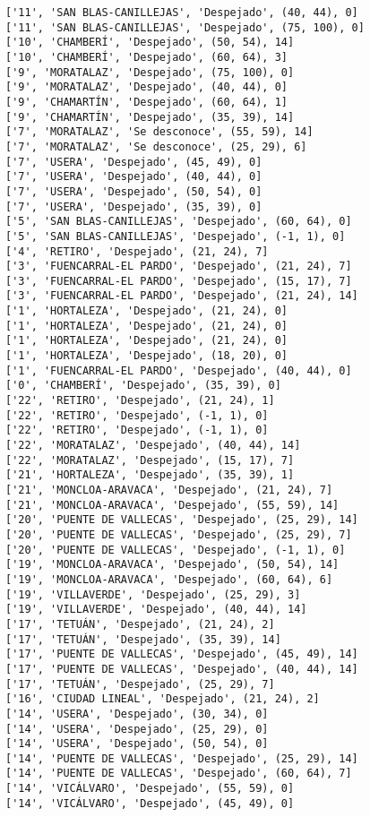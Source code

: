 \documentclass[11pt]{article}
\begin{document}
\begin{Verbatim}[commandchars=\\\{\}]
['11', 'SAN BLAS-CANILLEJAS', 'Despejado', (40, 44), 0]
['11', 'SAN BLAS-CANILLEJAS', 'Despejado', (75, 100), 0]
['10', 'CHAMBERÍ', 'Despejado', (50, 54), 14]
['10', 'CHAMBERÍ', 'Despejado', (60, 64), 3]
['9', 'MORATALAZ', 'Despejado', (75, 100), 0]
['9', 'MORATALAZ', 'Despejado', (40, 44), 0]
['9', 'CHAMARTÍN', 'Despejado', (60, 64), 1]
['9', 'CHAMARTÍN', 'Despejado', (35, 39), 14]
['7', 'MORATALAZ', 'Se desconoce', (55, 59), 14]
['7', 'MORATALAZ', 'Se desconoce', (25, 29), 6]
['7', 'USERA', 'Despejado', (45, 49), 0]
['7', 'USERA', 'Despejado', (40, 44), 0]
['7', 'USERA', 'Despejado', (50, 54), 0]
['7', 'USERA', 'Despejado', (35, 39), 0]
['5', 'SAN BLAS-CANILLEJAS', 'Despejado', (60, 64), 0]
['5', 'SAN BLAS-CANILLEJAS', 'Despejado', (-1, 1), 0]
['4', 'RETIRO', 'Despejado', (21, 24), 7]
['3', 'FUENCARRAL-EL PARDO', 'Despejado', (21, 24), 7]
['3', 'FUENCARRAL-EL PARDO', 'Despejado', (15, 17), 7]
['3', 'FUENCARRAL-EL PARDO', 'Despejado', (21, 24), 14]
['1', 'HORTALEZA', 'Despejado', (21, 24), 0]
['1', 'HORTALEZA', 'Despejado', (21, 24), 0]
['1', 'HORTALEZA', 'Despejado', (21, 24), 0]
['1', 'HORTALEZA', 'Despejado', (18, 20), 0]
['1', 'FUENCARRAL-EL PARDO', 'Despejado', (40, 44), 0]
['0', 'CHAMBERÍ', 'Despejado', (35, 39), 0]
['22', 'RETIRO', 'Despejado', (21, 24), 1]
['22', 'RETIRO', 'Despejado', (-1, 1), 0]
['22', 'RETIRO', 'Despejado', (-1, 1), 0]
['22', 'MORATALAZ', 'Despejado', (40, 44), 14]
['22', 'MORATALAZ', 'Despejado', (15, 17), 7]
['21', 'HORTALEZA', 'Despejado', (35, 39), 1]
['21', 'MONCLOA-ARAVACA', 'Despejado', (21, 24), 7]
['21', 'MONCLOA-ARAVACA', 'Despejado', (55, 59), 14]
['20', 'PUENTE DE VALLECAS', 'Despejado', (25, 29), 14]
['20', 'PUENTE DE VALLECAS', 'Despejado', (25, 29), 7]
['20', 'PUENTE DE VALLECAS', 'Despejado', (-1, 1), 0]
['19', 'MONCLOA-ARAVACA', 'Despejado', (50, 54), 14]
['19', 'MONCLOA-ARAVACA', 'Despejado', (60, 64), 6]
['19', 'VILLAVERDE', 'Despejado', (25, 29), 3]
['19', 'VILLAVERDE', 'Despejado', (40, 44), 14]
['17', 'TETUÁN', 'Despejado', (21, 24), 2]
['17', 'TETUÁN', 'Despejado', (35, 39), 14]
['17', 'PUENTE DE VALLECAS', 'Despejado', (45, 49), 14]
['17', 'PUENTE DE VALLECAS', 'Despejado', (40, 44), 14]
['17', 'TETUÁN', 'Despejado', (25, 29), 7]
['16', 'CIUDAD LINEAL', 'Despejado', (21, 24), 2]
['14', 'USERA', 'Despejado', (30, 34), 0]
['14', 'USERA', 'Despejado', (25, 29), 0]
['14', 'USERA', 'Despejado', (50, 54), 0]
['14', 'PUENTE DE VALLECAS', 'Despejado', (25, 29), 14]
['14', 'PUENTE DE VALLECAS', 'Despejado', (60, 64), 7]
['14', 'VICÁLVARO', 'Despejado', (55, 59), 0]
['14', 'VICÁLVARO', 'Despejado', (45, 49), 0]

\end{Verbatim}
\end{document}
